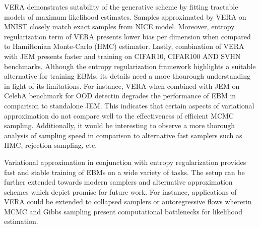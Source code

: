 \documentclass[11pt,letterpaper]{article}
\begin{document}
VERA demonstrates sutability of the generative scheme by fitting tractable models of maximum likelihood estimates. Samples approximated by VERA on MNIST closely match exact samples from NICE model. Moreover, entropy regularization term of VERA presents lower bias per dimension when compared to Hamiltonian Monte-Carlo (HMC) estimator. Lastly, combination of VERA with JEM presents faster and training on CIFAR10, CIFAR100 AND SVHN benchmarks. Although the entropy regularization framework highlights a suitable alternative for training EBMs, its details need a more thourough understanding in light of its limitations. For instance, VERA when combined with JEM on CelebA benchmark for OOD detectin degrades the performance of EBM in comparison to standalone JEM. This indicates that certain aspects of variational approximation do not compare well to the effectiveness of efficient MCMC sampling. Additionally, it would be interesting to observe a more thorough analysis of sampling speed in comparison to alternative fast samplers such as HMC, rejection sampling, etc. 

Variational approximation in conjunction with entropy regularization provides fast and stable training of EBMs on a wide variety of tasks. The setup can be further extended towards modern samplers and alternative approximation schemes which depict promise for future work. For instance, applications of VERA could be extended to collapsed samplers or autoregressive flows whererin MCMC and Gibbs sampling present computational bottlenecks for likelihood estimation. 
\end{document}
